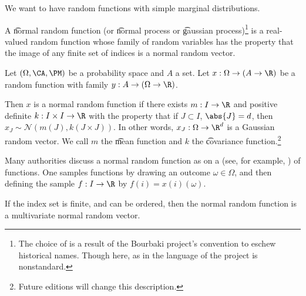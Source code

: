 

We want to have random functions with simple marginal distributions.


A \t{normal random function} (or \t{normal process} or \t{gaussian process})\footnote{The choice of  is a result of the Bourbaki project's convention to eschew historical names. Though here, as in  the language of the project is nonstandard.} is a real-valued random function whose family of random variables has the property that the image of any finite set of indices is a normal random vector.



Let $(\Omega, \CA, \PM)$ be a probability space and $A$ a set.
Let $x: \Omega \to (A \to \R)$ be a random function with family $y: A \to (\Omega \to \R)$.

Then $x$ is a normal random function if there exists $m: I \to \R$ and positive definite $k: I \times I \to \R$ with the property that if $J \subset I$, $\abs{J} = d$, then $x_J \sim \mathcal{N}(m(J), k(J \times J))$.
In other words, $x_J: \Omega \to \R^d$ is a Gaussian random vector.
We call $m$ the \t{mean function} and $k$ the \t{covariance function}.\footnote{Future editions will change this description.}


Many authorities discuss a normal random function as  on a  (see, for example, ) of functions.
One samples functions by drawing an outcome $\omega \in \Omega$, and then defining the sample $f: I \to \R$ by $f(i) = x(i)(\omega)$.


If the index set is finite, and can be ordered, then the normal random function is a multivariate normal random vector.

